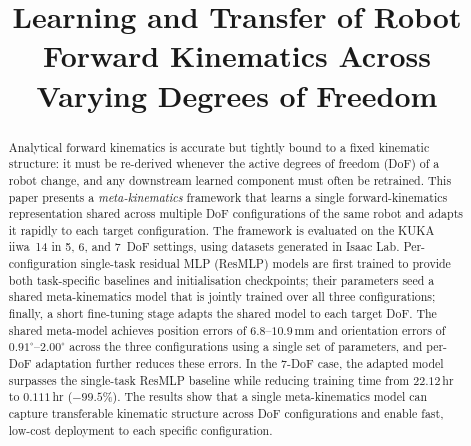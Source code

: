 \documentclass[conference]{IEEEtran}
\begin{document}
\title{Learning and Transfer of Robot Forward Kinematics Across Varying Degrees of Freedom}

\author{
\and
{}
\and
{}
}


\maketitle

\begin{abstract}
Analytical forward kinematics is accurate but tightly bound to a fixed kinematic structure: it must be re-derived whenever the active degrees of freedom (DoF) of a robot change, and any downstream learned component must often be retrained. This paper presents a \emph{meta-kinematics} framework that learns a single forward-kinematics representation shared across multiple DoF configurations of the same robot and adapts it rapidly to each target configuration. The framework is evaluated on the KUKA iiwa~14 in 5, 6, and 7~DoF settings, using datasets generated in Isaac Lab. Per-configuration single-task residual MLP (ResMLP) models are first trained to provide both task-specific baselines and initialisation checkpoints; their parameters seed a shared meta-kinematics model that is jointly trained over all three configurations; finally, a short fine-tuning stage adapts the shared model to each target DoF. The shared meta-model achieves position errors of $6.8$--$10.9$\,mm and orientation errors of $0.91^\circ$--$2.00^\circ$ across the three configurations using a single set of parameters, and per-DoF adaptation further reduces these errors. In the 7-DoF case, the adapted model surpasses the single-task ResMLP baseline while reducing training time from $22.12$\,hr to $0.111$\,hr ($-99.5\%$). The results show that a single meta-kinematics model can capture transferable kinematic structure across DoF configurations and enable fast, low-cost deployment to each specific configuration.
\end{abstract}
\end{document}
